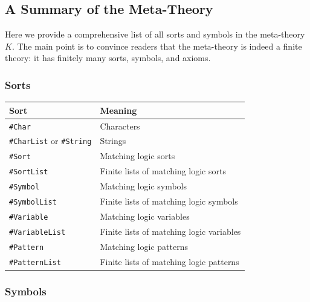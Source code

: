 \documentclass[UTF8,11pt]{article}
\theoremstyle{plain}
\theoremstyle{definition}
\theoremstyle{remark}
\newcommand{\sharpsymbol}{\#}
\newcommand{\KChar}{\texttt{\sharpsymbol Char}}
\newcommand{\KCharList}{\texttt{\sharpsymbol CharList}}
\newcommand{\KString}{\texttt{\sharpsymbol String}}
\newcommand{\KSort}{\texttt{\sharpsymbol Sort}}
\newcommand{\KSymbol}{\texttt{\sharpsymbol Symbol}}
\newcommand{\KPatternList}{\texttt{\sharpsymbol PatternList}}
\newcommand{\KSortList}{\texttt{\sharpsymbol SortList}}
\newcommand{\KSymbolList}{\texttt{\sharpsymbol SymbolList}}
\newcommand{\KVariableList}{\texttt{\sharpsymbol VariableList}}
\newcommand{\KVariable}{\texttt{\sharpsymbol Variable}}
\newcommand{\KPattern}{\texttt{\sharpsymbol Pattern}}
\begin{document}
\subsection{A Summary of the Meta-Theory}
\label{sec:K-summary}
Here we provide a comprehensive list of all sorts and symbols in the 
meta-theory $K$.
The main point is to convince readers that the meta-theory is indeed a finite 
theory: it has finitely many sorts, symbols, and axioms.

\subsubsection{Sorts}

\begin{center}
	\begin{tabular}{l|l}
		\textbf{Sort} & \textbf{Meaning} \\
		\hline
		\KChar & Characters \\
		{\KCharList} or \KString & Strings \\
		\KSort & Matching logic sorts \\
		\KSortList & Finite lists of matching logic sorts \\
		\KSymbol & Matching logic symbols \\
		\KSymbolList & Finite lists of matching logic symbols \\
		\KVariable & Matching logic variables \\
		\KVariableList & Finite lists of matching logic variables \\
		\KPattern & Matching logic patterns \\
		\KPatternList & Finite lists of matching logic patterns \\
	\end{tabular}
\end{center}

\subsubsection{Symbols}
\end{document}
